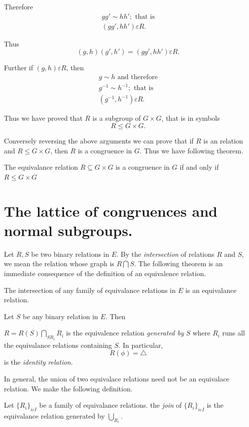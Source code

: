 Therefore
\begin{gather*}
  gg' \sim hh' ; \text { that is}\\
  (gg', hh') \varepsilon R.
\end{gather*}

Thus 
$$
(g,h) (g', h') = (gg', hh') \varepsilon R.
$$

Further if $(g,h) \varepsilon R$, then
\begin{gather*}
  g \sim h \text{ and therefore}\\
  g^{-1} \sim h^{-1} ; \text { that is}\\
  (g^{-1}, h^{-1}) \varepsilon R.
\end{gather*}

Thus we have proved that $R$ is a subgroup of $G \times G$, that is in
symbols 
$$
R \le G \times G.
$$

Conversely reversing the above arguments we can prove that if $R$ is
an relation and $R \le G \times G$, then $R$ is a congruence in
$G$. Thus we have following theorem.  
\begin{Theorem} %
  The equivalance relation $R \subseteq G \times G$ is a congruence in
  $G$ if and only if $ R \le G \times G$ 
\end{Theorem}

\section{ The lattice of congruences and normal subgroups.} %

Let $R,S$ be two binary relations in $E$. By the \textit{intersection}
of relations $R$ and $S$, we mean the relation whose graph is $R
\bigcap S$. The following theorem is an immediate consequence of the
definition of an equivalence relation. 
\begin{Theorem} %
  The intersection of any family of equivalance relations in $E$ is an
  equivalance relation.  
\end{Theorem}

Let $S$ be any binary relation in $E$. Then

$R = R (S) \bigcap\limits_{S R_i} R_i$ is the equivalence relation
\textit{ generated by} $S$ where $R_i$ runs all the equivalance
relations containing $S$. In particular, 
$$
R (\phi) = \triangle
$$
is the \textit {identity relation}.

In general, the union of two equivalace relations need not be an
equivalace relation. We make the following definition. 
\begin{definition}
  Let $\{R_i\}_{i \varepsilon I}$ be a family of equivalance
  relations. the \textit {join} of $\{R_i\}_{i \varepsilon I}$ is the
  equivalance relation generated by $\bigcup _{R_i}$. 
\end{definition} 

